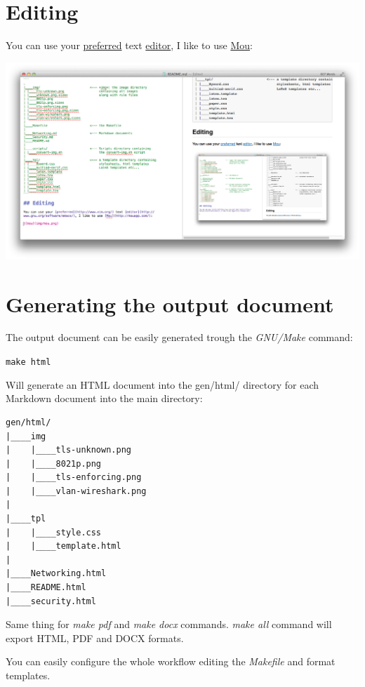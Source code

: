 \documentclass[	DIV=calc,%
							paper=a4,%
							fontsize=10pt]{scrartcl}	 					%
\let\origfigure=\figure
\let\endorigfigure=\endfigure
\renewenvironment{figure}[1][]{%
   \origfigure[H]
}{%
   \endorigfigure
}
\begin{document}
\section{Editing}\label{editing}

You can use your \href{http://www.vim.org/}{preferred} text
\href{http://www.gnu.org/software/emacs/}{editor}, I like to use
\href{http://mouapp.com/}{Mou}:

\begin{figure}[htbp]
\centering
\includegraphics{img/mou.png}
\caption{The mou editor}
\end{figure}

\section{Generating the output
document}\label{generating-the-output-document}

The output document can be easily generated trough the \emph{GNU/Make}
command:

\texttt{make html}

Will generate an HTML document into the gen/html/ directory for each
Markdown document into the main directory:

\begin{verbatim}
gen/html/
|____img
|    |____tls-unknown.png
|    |____8021p.png
|    |____tls-enforcing.png
|    |____vlan-wireshark.png
|
|____tpl
|    |____style.css
|    |____template.html
|
|____Networking.html
|____README.html
|____security.html
\end{verbatim}

Same thing for \emph{make pdf} and \emph{make docx} commands. \emph{make
all} command will export HTML, PDF and DOCX formats.

You can easily configure the whole workflow editing the \emph{Makefile}
and format templates.
\end{document}
